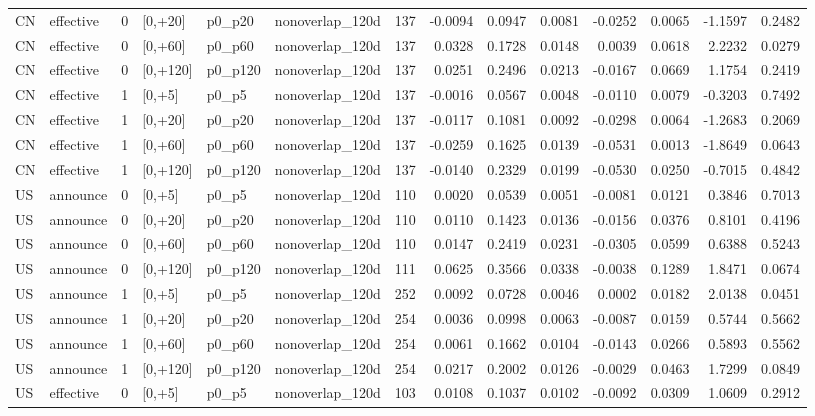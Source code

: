 \begin{tabular}{llrlllrrrrrrrr}
CN & effective & 0 & [0,+20] & p0_p20 & nonoverlap_120d & 137 & -0.0094 & 0.0947 & 0.0081 & -0.0252 & 0.0065 & -1.1597 & 0.2482 \\
CN & effective & 0 & [0,+60] & p0_p60 & nonoverlap_120d & 137 & 0.0328 & 0.1728 & 0.0148 & 0.0039 & 0.0618 & 2.2232 & 0.0279 \\
CN & effective & 0 & [0,+120] & p0_p120 & nonoverlap_120d & 137 & 0.0251 & 0.2496 & 0.0213 & -0.0167 & 0.0669 & 1.1754 & 0.2419 \\
CN & effective & 1 & [0,+5] & p0_p5 & nonoverlap_120d & 137 & -0.0016 & 0.0567 & 0.0048 & -0.0110 & 0.0079 & -0.3203 & 0.7492 \\
CN & effective & 1 & [0,+20] & p0_p20 & nonoverlap_120d & 137 & -0.0117 & 0.1081 & 0.0092 & -0.0298 & 0.0064 & -1.2683 & 0.2069 \\
CN & effective & 1 & [0,+60] & p0_p60 & nonoverlap_120d & 137 & -0.0259 & 0.1625 & 0.0139 & -0.0531 & 0.0013 & -1.8649 & 0.0643 \\
CN & effective & 1 & [0,+120] & p0_p120 & nonoverlap_120d & 137 & -0.0140 & 0.2329 & 0.0199 & -0.0530 & 0.0250 & -0.7015 & 0.4842 \\
US & announce & 0 & [0,+5] & p0_p5 & nonoverlap_120d & 110 & 0.0020 & 0.0539 & 0.0051 & -0.0081 & 0.0121 & 0.3846 & 0.7013 \\
US & announce & 0 & [0,+20] & p0_p20 & nonoverlap_120d & 110 & 0.0110 & 0.1423 & 0.0136 & -0.0156 & 0.0376 & 0.8101 & 0.4196 \\
US & announce & 0 & [0,+60] & p0_p60 & nonoverlap_120d & 110 & 0.0147 & 0.2419 & 0.0231 & -0.0305 & 0.0599 & 0.6388 & 0.5243 \\
US & announce & 0 & [0,+120] & p0_p120 & nonoverlap_120d & 111 & 0.0625 & 0.3566 & 0.0338 & -0.0038 & 0.1289 & 1.8471 & 0.0674 \\
US & announce & 1 & [0,+5] & p0_p5 & nonoverlap_120d & 252 & 0.0092 & 0.0728 & 0.0046 & 0.0002 & 0.0182 & 2.0138 & 0.0451 \\
US & announce & 1 & [0,+20] & p0_p20 & nonoverlap_120d & 254 & 0.0036 & 0.0998 & 0.0063 & -0.0087 & 0.0159 & 0.5744 & 0.5662 \\
US & announce & 1 & [0,+60] & p0_p60 & nonoverlap_120d & 254 & 0.0061 & 0.1662 & 0.0104 & -0.0143 & 0.0266 & 0.5893 & 0.5562 \\
US & announce & 1 & [0,+120] & p0_p120 & nonoverlap_120d & 254 & 0.0217 & 0.2002 & 0.0126 & -0.0029 & 0.0463 & 1.7299 & 0.0849 \\
US & effective & 0 & [0,+5] & p0_p5 & nonoverlap_120d & 103 & 0.0108 & 0.1037 & 0.0102 & -0.0092 & 0.0309 & 1.0609 & 0.2912 \\

\end{tabular}
